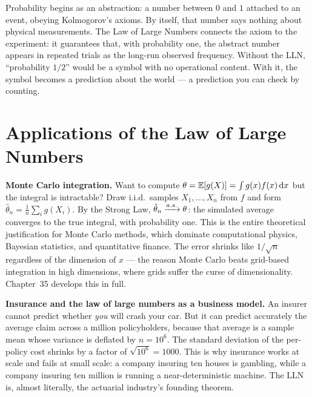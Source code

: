 \begin{aestheticbox}
Probability begins as an abstraction: a number between $0$ and $1$ attached to an event, obeying Kolmogorov's axioms. By itself, that number says nothing about physical measurements. The Law of Large Numbers connects the axiom to the experiment: it guarantees that, with probability one, the abstract number appears in repeated trials as the long-run observed frequency. Without the LLN, ``probability $1/2$'' would be a symbol with no operational content. With it, the symbol becomes a prediction about the world --- a prediction you can check by counting.
\end{aestheticbox}

\section{Applications of the Law of Large Numbers}
\label{ch20:applications}

\begin{applicationbox}
\textbf{Monte Carlo integration.} Want to compute $\theta = \operatorname{\mathbb{E}}[g(X)] = \int g(x)f(x)\,\mathrm{d} x$ but the integral is intractable? Draw i.i.d.\ samples $X_1,\dots,X_n$ from $f$ and form $\hat\theta_n = \tfrac1n\sum_i g(X_i)$. By the Strong Law, $\hat\theta_n \xrightarrow{a.s.} \theta$: the simulated average converges to the true integral, with probability one. This is the entire theoretical justification for Monte Carlo methods, which dominate computational physics, Bayesian statistics, and quantitative finance. The error shrinks like $1/\sqrt n$ regardless of the dimension of $x$ --- the reason Monte Carlo beats grid-based integration in high dimensions, where grids suffer the curse of dimensionality. Chapter~35 develops this in full.
\end{applicationbox}

\begin{applicationbox}
\textbf{Insurance and the law of large numbers as a business model.} An insurer cannot predict whether \emph{you} will crash your car. But it can predict accurately the average claim across a million policyholders, because that average is a sample mean whose variance is deflated by $n = 10^6$. The standard deviation of the per-policy cost shrinks by a factor of $\sqrt{10^6} = 1000$. This is why insurance works at scale and fails at small scale: a company insuring ten houses is gambling, while a company insuring ten million is running a near-deterministic machine. The LLN is, almost literally, the actuarial industry's founding theorem.
\end{applicationbox}

